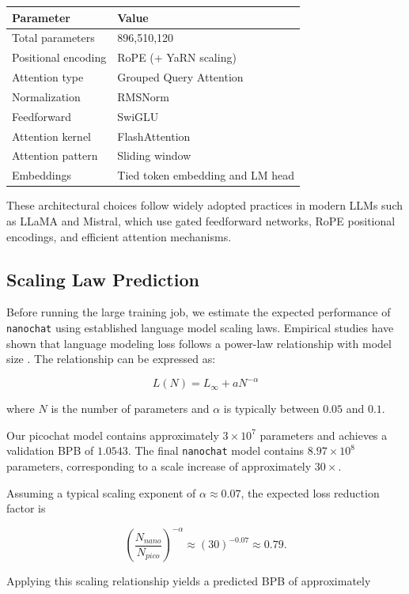 \documentclass[a4paper,12pt]{article}
\begin{document}
\begin{center}
\begin{tabular}{ll}
\hline
Parameter & Value \\
\hline
Total parameters & 896,510,120 \\
Positional encoding & RoPE (+ YaRN scaling) \\
Attention type & Grouped Query Attention \\
Normalization & RMSNorm \\
Feedforward & SwiGLU \\
Attention kernel & FlashAttention \\
Attention pattern & Sliding window \\
Embeddings & Tied token embedding and LM head \\
\hline
\end{tabular}
\end{center}

These architectural choices follow widely adopted practices in modern LLMs such as LLaMA and Mistral, which use gated feedforward networks, RoPE positional encodings, and efficient attention mechanisms.

\subsection{Scaling Law Prediction}

Before running the large training job, we estimate the expected performance of \texttt{nanochat} using established language model scaling laws. Empirical studies have shown that language modeling loss follows a power-law relationship with model size \cite{kaplan2020scaling}. The relationship can be expressed as:

\[
L(N) = L_{\infty} + aN^{-\alpha}
\]

where \(N\) is the number of parameters and \(\alpha\) is typically between \(0.05\) and \(0.1\).

Our picochat model contains approximately \(3\times10^7\) parameters and achieves a validation BPB of \(1.0543\). The final \texttt{nanochat} model contains \(8.97\times10^8\) parameters, corresponding to a scale increase of approximately \(30\times\).

Assuming a typical scaling exponent of \(\alpha \approx 0.07\), the expected loss reduction factor is

\[
\left(\frac{N_{nano}}{N_{pico}}\right)^{-\alpha}
\approx (30)^{-0.07} \approx 0.79 .
\]

Applying this scaling relationship yields a predicted BPB of approximately
\end{document}
